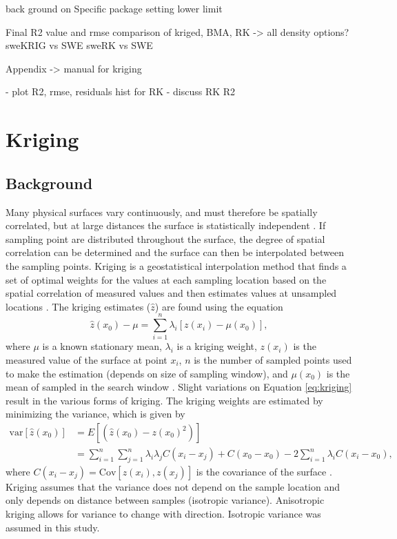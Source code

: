 \documentclass[12pt]{article}
\begin{document}
back ground on Specific package
setting lower limit 

Final R2 value and rmse comparison of kriged, BMA, RK -> all density options?
sweKRIG vs SWE
sweRK vs SWE


Appendix -> manual for kriging 


- plot R2, rmse, residuals hist for RK
- discuss RK R2


\section{Kriging}

\subsection{Background}

Many physical surfaces vary continuously, and must therefore be spatially correlated, but at large distances the surface is statistically independent \citep{Davis1986}. If sampling point are distributed throughout the surface, the degree of spatial correlation can be determined and the surface can then be interpolated between the sampling points. Kriging is a geostatistical interpolation method that finds a set of optimal weights for the values at each sampling location based on the spatial correlation of measured values and then estimates values at unsampled locations \citep{Davis1986, Li2014}. The kriging estimates ($\hat{z}$) are found using the equation
\begin{equation}
\label{eq:kriging}
\hat{z}(x_0) - \mu = \sum_{i=1}^{n} \lambda_i [z(x_i)-\mu(x_0)],
\end{equation}
where $\mu$ is a known stationary mean, $\lambda_i$ is a kriging weight, $z(x_i)$ is the measured value of the surface at point $x_i$, $n$ is the number of sampled points used to make the estimation (depends on size of sampling window), and $\mu(x_0)$ is the mean of sampled in the search window \cite{Wackernagel2003, Li2008}. Slight variations on Equation \ref{eq:kriging} result in the various forms of kriging. The kriging weights are estimated by minimizing the variance, which is given by
\begin{align}
\mathrm{var}[\hat{z}(x_0)] &= E[(\hat{z}(x_0)-z(x_0)^2)]\\
&=\sum_{i=1}^{n}\sum_{j=1}^{n}\lambda_i \lambda_j C(x_i-x_j)+C(x_0-x_0)-2 \sum_{i=1}^{n} \lambda_i C(x_i-x_0),
\end{align}
where $C(x_i-x_j) = \mathrm{Cov}[z(x_i),z(x_j)]$ is the covariance of the surface \citep{Li2008}. Kriging assumes that the variance does not depend on the sample location and only depends on distance between samples (isotropic variance).  Anisotropic kriging allows for variance to change with direction. Isotropic variance was assumed in this study.
\end{document}
